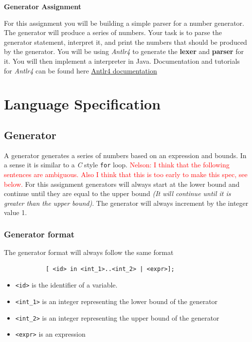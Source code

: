 \documentclass{article}
\newcommand{\code}[1]{\texttt{\textmd{#1}}}
\newcommand{\nelson}[1]{\noindent\textcolor{red}{Nelson: {#1}}}
\newcommand{\nelson}[1]{}
\begin{document}
\ifpdf
	\LARGE
	\textbf{Generator Assignment}
	\normalsize
\fi


For this assignment you will be building a simple parser for a number generator. The generator will produce a series of
numbers. Your task is to parse the generator statement, interpret it, and print the numbers that should be produced by
the generator. You will be using \textit{Antlr4} to generate the \textbf{lexer} and \textbf{parser} for it. You will
then implement a interpreter in Java. Documentation and tutorials for \textit{Antlr4} can be found here 
\href{https://github.com/antlr/antlr4/blob/master/doc/index.md}
{Antlr4 documentation}


\section{Language Specification}

	\subsection{Generator}
		A generator generates a series of numbers based on an expression and bounds.  In a sense it is similar to a
		\textit{C} style \code{for} loop. \nelson{I think that the following sentences are ambiguous. Also I think that this is too early to make this spec, see below.} For this assignment generators will always start at the lower bound and continue
		until they are equal to the upper bound \textit{(It will continue until it is greater than the upper bound)}. The
		generator will always increment by the integer value 1.
                 
	\subsubsection{Generator format}
		The generator format will always follow the same format
		
		\begin{lstlisting}
			[ <id> in <int_1>..<int_2> | <expr>];
		\end{lstlisting}

		\begin{itemize}
			\item{\code{<id>}} is the identifier of a variable.
			\item{\code{<int\_1>}} is an integer representing the lower bound of the generator
			\item{\code{<int\_2>}} is an integer representing the upper bound of the generator
			\item{\code{<expr>}} is an expression
		\end{itemize}
\end{document}
